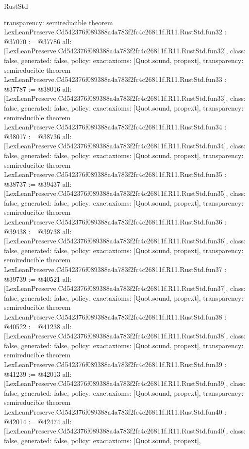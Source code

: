 \begin{lexlean}{RustStd}
\begin{coremodule}
{  transparency: semireducible
}
theorem LexLeanPreserve.Cd542376f089388a4a783f2fc4c26811f.R11.RustStd.fun32 : @37070 := @37786 {
  all: [LexLeanPreserve.Cd542376f089388a4a783f2fc4c26811f.R11.RustStd.fun32],
  class: false,
  generated: false,
  policy: exact{axioms: [Quot.sound, propext]},
  transparency: semireducible
}
theorem LexLeanPreserve.Cd542376f089388a4a783f2fc4c26811f.R11.RustStd.fun33 : @37787 := @38016 {
  all: [LexLeanPreserve.Cd542376f089388a4a783f2fc4c26811f.R11.RustStd.fun33],
  class: false,
  generated: false,
  policy: exact{axioms: [Quot.sound, propext]},
  transparency: semireducible
}
theorem LexLeanPreserve.Cd542376f089388a4a783f2fc4c26811f.R11.RustStd.fun34 : @38017 := @38736 {
  all: [LexLeanPreserve.Cd542376f089388a4a783f2fc4c26811f.R11.RustStd.fun34],
  class: false,
  generated: false,
  policy: exact{axioms: [Quot.sound, propext]},
  transparency: semireducible
}
theorem LexLeanPreserve.Cd542376f089388a4a783f2fc4c26811f.R11.RustStd.fun35 : @38737 := @39437 {
  all: [LexLeanPreserve.Cd542376f089388a4a783f2fc4c26811f.R11.RustStd.fun35],
  class: false,
  generated: false,
  policy: exact{axioms: [Quot.sound, propext]},
  transparency: semireducible
}
theorem LexLeanPreserve.Cd542376f089388a4a783f2fc4c26811f.R11.RustStd.fun36 : @39438 := @39738 {
  all: [LexLeanPreserve.Cd542376f089388a4a783f2fc4c26811f.R11.RustStd.fun36],
  class: false,
  generated: false,
  policy: exact{axioms: [Quot.sound, propext]},
  transparency: semireducible
}
theorem LexLeanPreserve.Cd542376f089388a4a783f2fc4c26811f.R11.RustStd.fun37 : @39739 := @40521 {
  all: [LexLeanPreserve.Cd542376f089388a4a783f2fc4c26811f.R11.RustStd.fun37],
  class: false,
  generated: false,
  policy: exact{axioms: [Quot.sound, propext]},
  transparency: semireducible
}
theorem LexLeanPreserve.Cd542376f089388a4a783f2fc4c26811f.R11.RustStd.fun38 : @40522 := @41238 {
  all: [LexLeanPreserve.Cd542376f089388a4a783f2fc4c26811f.R11.RustStd.fun38],
  class: false,
  generated: false,
  policy: exact{axioms: [Quot.sound, propext]},
  transparency: semireducible
}
theorem LexLeanPreserve.Cd542376f089388a4a783f2fc4c26811f.R11.RustStd.fun39 : @41239 := @42013 {
  all: [LexLeanPreserve.Cd542376f089388a4a783f2fc4c26811f.R11.RustStd.fun39],
  class: false,
  generated: false,
  policy: exact{axioms: [Quot.sound, propext]},
  transparency: semireducible
}
theorem LexLeanPreserve.Cd542376f089388a4a783f2fc4c26811f.R11.RustStd.fun40 : @42014 := @42474 {
  all: [LexLeanPreserve.Cd542376f089388a4a783f2fc4c26811f.R11.RustStd.fun40],
  class: false,
  generated: false,
  policy: exact{axioms: [Quot.sound, propext]},
}
\end{coremodule}
\end{lexlean}
